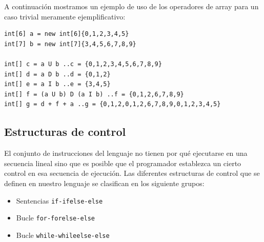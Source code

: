 \documentclass[11pt, english]{article}
\begin{document}
A continuación mostramos un ejemplo de uso de los operadores de array para un caso trivial meramente ejemplificativo:
\begin{lstlisting}[caption=Ejemplo de uso de operadores de array]
int[6] a = new int[6]{0,1,2,3,4,5}
int[7] b = new int[7]{3,4,5,6,7,8,9}

int[] c = a U b ..c = {0,1,2,3,4,5,6,7,8,9}
int[] d = a D b ..d = {0,1,2}
int[] e = a I b ..e = {3,4,5}
int[] f = (a U b) D (a I b) ..f = {0,1,2,6,7,8,9}
int[] g = d + f + a ..g = {0,1,2,0,1,2,6,7,8,9,0,1,2,3,4,5}
\end{lstlisting}

\subsection{Estructuras de control}
El conjunto de instrucciones del lenguaje no tienen por qué ejecutarse en una secuencia lineal sino que es posible que el programador establezca un cierto control en esa secuencia de ejecución. Las diferentes estructuras de control que se definen en nuestro lenguaje se clasifican en los siguiente grupos:

\begin{itemize}
	\item Sentencias \texttt{if-ifelse-else}
	\item Bucle \texttt{for-forelse-else}
	\item Bucle \texttt{while-whileelse-else}
\end{itemize}
\end{document}
